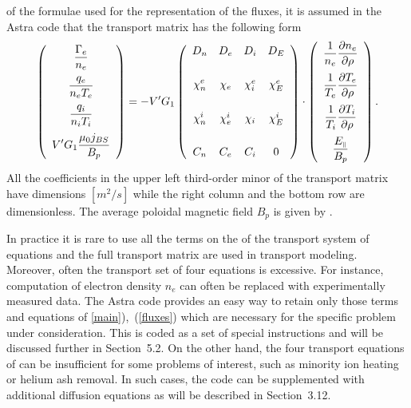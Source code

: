 of the formulae used for the representation of the fluxes, it is assumed
in the Astra code that the transport matrix has the following form 
\begin{equation}\label{fluxes}
\left(
\begin{array}{c}\dstyle
\frac{\Gamma_e}{n_e}
\medskip\\ \dstyle
\frac{q_e}{n_eT_e}
\medskip\\ \dstyle
\frac{q_i}{n_iT_i}
\medskip\\ \dstyle
V'G_1\frac{\mu_0 j_{BS}}{B_p}
\end{array}
\right)
=-V'G_1
\left(
\begin{array}{cccc}
D_n & D_e & D_i & D_E
\bigskip\medskip\\ \dstyle
\chi_n^e & \chi_e & \chi_i^e & \chi_E^e
\bigskip\medskip\\ \dstyle
\chi_n^i & \chi_e^i & \chi_i & \chi_E^i
\bigskip\medskip\\ \dstyle
C_n & C_e & C_i & 0
\end{array}
\right)
\cdot
\left(
\begin{array}{c}\dstyle
\frac{1}{n_e}\prti{n_e}{\rho}
\medskip\\ \dstyle
\frac{1}{T_e}\prti{T_e}{\rho}
\medskip\\ \dstyle
\frac{1}{T_i}\prti{T_i}{\rho}
\medskip\\ \dstyle
\frac{E_\pll}{B_p}
\end{array}
\right)
.\end{equation}
All the coefficients in the upper left third-order minor of the
transport matrix have dimensions $[m^2/s]$ while
the right column and the bottom row are dimensionless. 
The average poloidal magnetic field $B_p$ is given by . 

In practice it is rare to use all the terms on the \rhs of the transport
system of equations  and the full transport matrix
 are used in transport modeling.
Moreover, often the transport set of four equations  is
excessive. 
For instance, computation of electron density $n_e$ can often be
replaced with experimentally measured data. 
The Astra code provides an easy way to retain only those terms and
equations of \eqs\ref{main}),~(\ref{fluxes}) which are necessary for the
specific problem under consideration. 
This is coded as a set of special instructions and will be discussed
further in Section~5.2. 
On the other hand, the four transport equations of  can be
insufficient for some problems of interest, such as minority ion heating
or helium ash removal. In such cases, the code can be supplemented with
additional diffusion equations as will be described in Section~3.12. 

